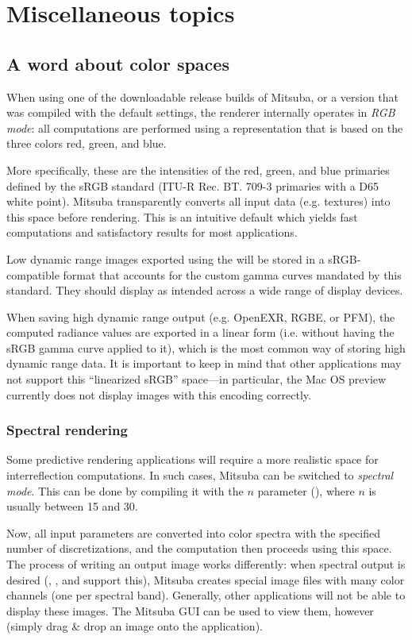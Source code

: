 \section{Miscellaneous topics}
\label{sec:miscellaneous}
\subsection{A word about color spaces}
\label{sec:colorspaces}
When using one of the downloadable release builds of Mitsuba, or a version
that was compiled with the default settings, the renderer internally
operates in \emph{RGB mode}: all computations are performed using a representation
that is based on the three colors red, green, and blue.

More specifically, these are the intensities of the red, green, and blue primaries
defined by the sRGB standard (ITU-R Rec. BT. 709-3 primaries with a D65 white point).
Mitsuba transparently converts all input data (e.g. textures) into this space before
rendering. This is an intuitive default which yields fast computations and
satisfactory results for most applications.

Low dynamic range images exported using the  will be stored in a
sRGB-compatible format that accounts for the custom gamma curves mandated by this
standard. They should display as intended across a wide range of display devices.

When saving high dynamic range output (e.g. OpenEXR, RGBE, or PFM), the computed radiance
values are exported in a linear form (i.e. without having the sRGB gamma curve applied to it),
which is the most common way of storing high dynamic range data.
It is important to keep in mind that other applications may not support this
``linearized sRGB'' space---in particular, the Mac OS preview currently
does not display images with this encoding correctly.

\subsubsection{Spectral rendering}
Some predictive rendering applications will require a more realistic space for
interreflection computations. In such cases, Mitsuba can be switched to \emph{spectral mode}.
This can be done by compiling it with the $n$ parameter
(), where $n$ is usually between 15 and 30.

Now, all input parameters are converted into color spectra with the specified
number of discretizations, and the computation then proceeds using this space.
The process of writing an output image works differently: when spectral output
is desired (, , and 
support this), Mitsuba creates special image files with many color channels (one
per spectral band).
Generally, other applications will not be able to display these images. The Mitsuba GUI
can be used to view them, however (simply drag \& drop an image onto the application).

